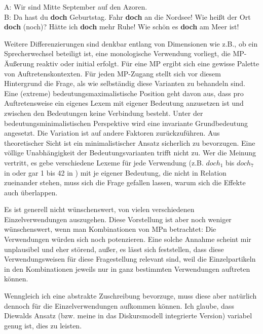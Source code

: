 \begin{exe}
	\ex\label{253} 
		\begin{xlist}	
			\ex\label{253a} A: Wir sind Mitte September auf den Azoren.\\
							B: Da hast du \textbf{doch} Geburtstag.
			\ex\label{253b} Fahr \textbf{doch} an die Nordsee!
			\ex\label{153c} Wie heißt der Ort \textbf{doch} (noch)?
			\ex\label{253d} Hätte ich \textbf{doch} mehr Ruhe!
			\ex\label{153e} Wie schön es \textbf{doch} am Meer ist!
		\end{xlist}
\end{exe}
Weitere Differenzierungen sind denkbar entlang von Dimensionen wie z.B., ob ein Sprecherwechsel beteiligt ist, eine monologische Verwendung vorliegt, die MP-Äußerung reaktiv oder initial erfolgt. Für eine MP ergibt sich eine gewisse Palette von Auftretenskontexten. Für jeden MP-Zugang stellt sich vor diesem Hintergrund die Frage, als wie selbständig diese Varianten zu behandeln sind. Eine (extreme) bedeutungsmaximalistische Position geht davon aus, dass pro Auftretensweise ein eigenes Lexem mit eigener Bedeutung anzusetzen ist und zwischen den Bedeutungen keine Verbindung besteht. Unter der bedeutungsminimalistischen Perspektive  wird eine invariante Grundbedeutung angesetzt. Die Variation ist auf andere Faktoren zurückzuführen. Aus theoretischer Sicht ist ein minimalistischer Ansatz sicherlich zu bevorzugen. Eine völlige Unabhängigkeit der Bedeutungsvarianten trifft nicht zu. Wer die Meinung vertritt, es gebe verschiedene Lexeme für jede Verwendung (z.B. $doch_{1}$ bis $doch_{7}$ in \citealt[33-34]{Helbig1981} oder gar 1 bis 42 in \citealt{Volmert1991}) mit je eigener Bedeutung, die nicht in Relation zueinander stehen, muss sich die Frage gefallen lassen, warum sich die Effekte auch überlappen. 

Es ist generell nicht wünschenswert, von vielen verschiedenen Einzelverwendungen auszugehen. Diese Vorstellung ist aber noch weniger wünschenswert, wenn man Kombinationen von MPn betrachtet: Die Verwendungen würden sich noch potenzieren. Eine solche Annahme scheint mir unplausibel und eher störend, außer, es lässt sich feststellen, dass diese Verwendungsweisen für diese Fragestellung relevant sind, weil die Einzelpartikeln in den Kombinationen jeweils nur in ganz bestimmten Verwendungen auftreten können.

Wenngleich ich eine abstrakte Zuschreibung bevorzuge, muss diese aber natürlich dennoch für die Einzelverwendungen aufkommen können. Ich glaube, dass Diewalds Ansatz (bzw. meine in das Diskursmodell integrierte Version) variabel genug ist, dies zu leisten. 

